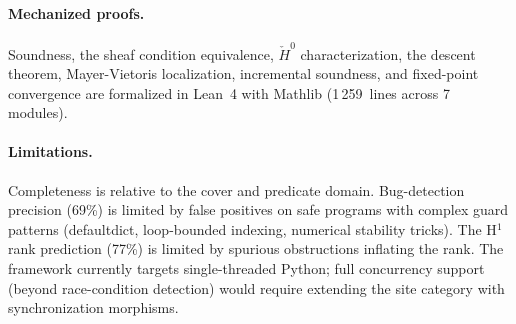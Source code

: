 \documentclass[acmsmall,screen]{acmart}
\theoremstyle{remark}
\newcommand{\Hc}[1]{\check{H}^{#1}}
\begin{document}
\paragraph{Mechanized proofs.}
Soundness, the sheaf condition equivalence, $\Hc{0}$ characterization,
the descent theorem, Mayer-Vietoris localization, incremental
soundness, and fixed-point convergence are formalized in Lean~4
with Mathlib (1\,259~lines across 7 modules).

\paragraph{Limitations.}
Completeness is relative to the cover and predicate domain.
Bug-detection precision (69\%) is limited by false positives on safe
programs with complex guard patterns (defaultdict, loop-bounded
indexing, numerical stability tricks).  The H$^1$ rank prediction
(77\%) is limited by spurious obstructions inflating the rank.
The framework currently targets single-threaded Python; full
concurrency support (beyond race-condition detection) would require
extending the site category with synchronization morphisms.
\end{document}
